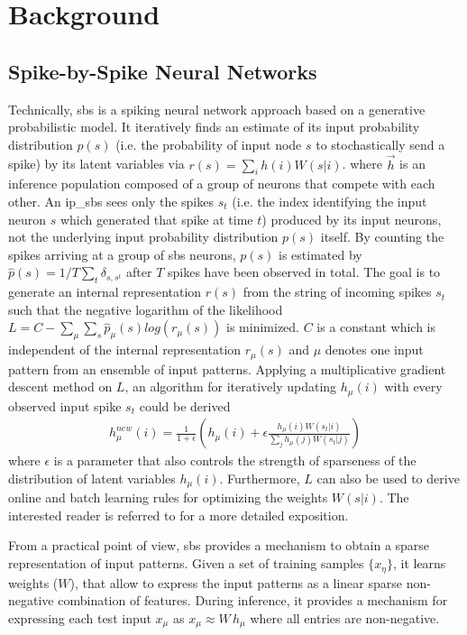 \chapter{Background}\label{chap.background}
\minitoc

\section{Spike-by-Spike Neural Networks} 

\label{sec:sbs}

Technically, \gls{sbs} is a spiking neural network approach based on a
generative probabilistic model. It iteratively finds an estimate of
its input probability distribution $p(s)$ (i.e. the probability of
input node $s$ to stochastically send a spike) by its latent variables
via $r(s) = \sum_i h(i) W(s|i)$. 
where $\vec{h}$ is an inference
population composed of a group of neurons that compete with each
other. An \gls{ip_sbs} sees only the spikes $s_t$ (i.e. the
index identifying the input neuron $s$ which generated that spike at
time $t$) produced by its input neurons, not the underlying input
probability distribution $p(s)$ itself. By counting the spikes
arriving at a group of \gls{sbs} neurons, $p(s)$ is estimated by
$\hat{p}(s) = 1/T \sum_t \delta_{s,s^t}$ after $T$ spikes have been
observed in total. The goal is to generate an internal representation
$r(s)$ from the string of incoming spikes $s_t$ such that the negative
logarithm of the likelihood
$L = C - \sum_\mu \sum_s \hat{p}_\mu(s) log\left( r_\mu(s) \right)$ is
minimized. $C$ is a constant which is independent of the internal
representation $r_\mu(s)$ and $\mu$ denotes one input pattern from an
ensemble of input patterns. Applying a multiplicative gradient descent
method on $L$, an algorithm for iteratively updating $h_\mu(i)$ with
every observed input spike $s_t$ could be derived
\cite{ernst2007efficient}
\begin{eqnarray} \label{eq:sbs_update}
h_\mu^{new}(i) = \frac{1}{1+\epsilon} \left(h_\mu(i) + \epsilon \frac{h_\mu(i) W(s_t|i) }{\sum_j h_\mu(j) W(s_t|j)} \right) 
\end{eqnarray}
where $\epsilon$ is a parameter that also controls the strength of sparseness of the distribution of latent variables $h_\mu(i)$. Furthermore, $L$ can also be used to derive online and batch learning rules for optimizing the weights $W(s|i)$. The interested reader is referred to \cite{ernst2007efficient} for a more detailed exposition.

From a practical point of view, \gls{sbs} provides a mechanism to obtain a sparse representation of input patterns. Given a set of
	training samples $\{x_\eta\}$, it learns weights ($W$), that allow
	to express the input patterns as a linear sparse non-negative combination
	of features.  During inference, it provides a mechanism for expressing
	each test input $x_\mu$ as $x_\mu \approx W\, h_\mu$ where all
	entries are non-negative.
	
